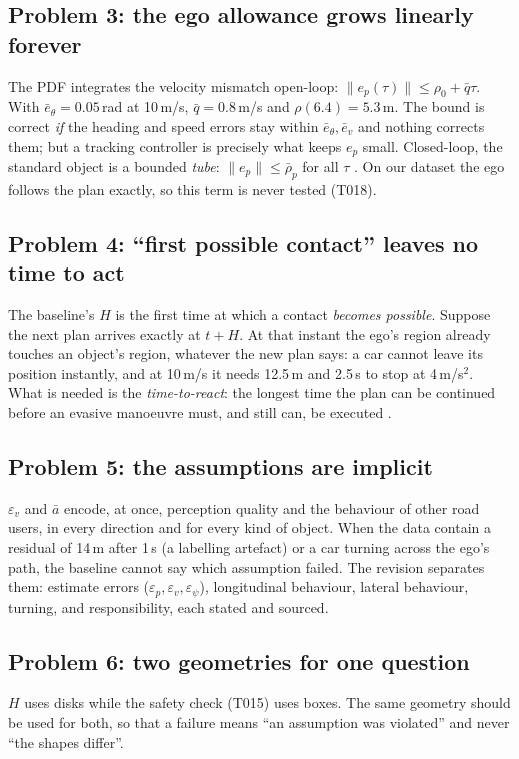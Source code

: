 \documentclass[11pt]{article}
\theoremstyle{definition}
\theoremstyle{remark}
\begin{document}
\subsection{Problem 3: the ego allowance grows linearly forever}
The PDF integrates the velocity mismatch open-loop: $\|e_p(\tau)\|\le\rho_0+\bar q\tau$. With
$\bar e_\theta=0.05$\,rad at 10\,m/s, $\bar q=0.8$\,m/s and $\rho(6.4)=5.3$\,m. The bound is correct
\emph{if} the heading and speed errors stay within $\bar e_\theta,\bar e_v$ and nothing corrects them;
but a tracking controller is precisely what keeps $e_p$ small. Closed-loop, the standard object is a
bounded \emph{tube}: $\|e_p\|\le\bar\rho_p$ for all $\tau$ \cite{mayne2005}. On our dataset the ego follows
the plan exactly, so this term is never tested (T018).

\subsection{Problem 4: ``first possible contact'' leaves no time to act}
The baseline's $H$ is the first time at which a contact \emph{becomes possible}. Suppose the next plan
arrives exactly at $t+H$. At that instant the ego's region already touches an object's region, whatever
the new plan says: a car cannot leave its position instantly, and at 10\,m/s it needs 12.5\,m and 2.5\,s
to stop at 4\,m/s$^2$. What is needed is the \emph{time-to-react}: the longest time the plan can be continued
before an evasive manoeuvre must, and still can, be executed \cite{hillenbrand2006,sontges2018}.

\subsection{Problem 5: the assumptions are implicit}
$\varepsilon_v$ and $\bar a$ encode, at once, perception quality and the behaviour of other road users,
in every direction and for every kind of object. When the data contain a residual of 14\,m after 1\,s (a
labelling artefact) or a car turning across the ego's path, the baseline cannot say which assumption
failed. The revision separates them: estimate errors ($\varepsilon_p,\varepsilon_v,\varepsilon_\psi$),
longitudinal behaviour, lateral behaviour, turning, and responsibility, each stated and sourced.

\subsection{Problem 6: two geometries for one question}
$H$ uses disks while the safety check (T015) uses boxes. The same geometry should be used for both, so
that a failure means ``an assumption was violated'' and never ``the shapes differ''.
\end{document}
